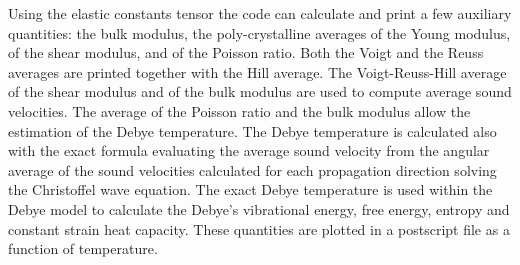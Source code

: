 \documentclass[12pt,a4paper]{article}
\begin{document}
Using the elastic constants tensor the code can calculate and print
a few auxiliary quantities:
the bulk modulus, the poly-crystalline averages of the Young modulus,
of the shear modulus, and of the Poisson ratio. Both the Voigt and the
Reuss averages are printed together with the Hill average.
The Voigt-Reuss-Hill average of the shear modulus and of the bulk modulus are 
used to compute average sound velocities. The average of the Poisson ratio and
the bulk modulus allow the estimation of the Debye 
temperature. The Debye temperature is calculated also with the exact 
formula evaluating the average sound 
velocity from the angular average of the sound velocities calculated 
for each propagation direction solving the Christoffel wave equation.
The exact Debye temperature is used within the Debye model to calculate the
Debye's vibrational energy, free energy, entropy and constant strain heat
capacity. These quantities are plotted in a postscript file as a function
of temperature.

%
\end{document}
